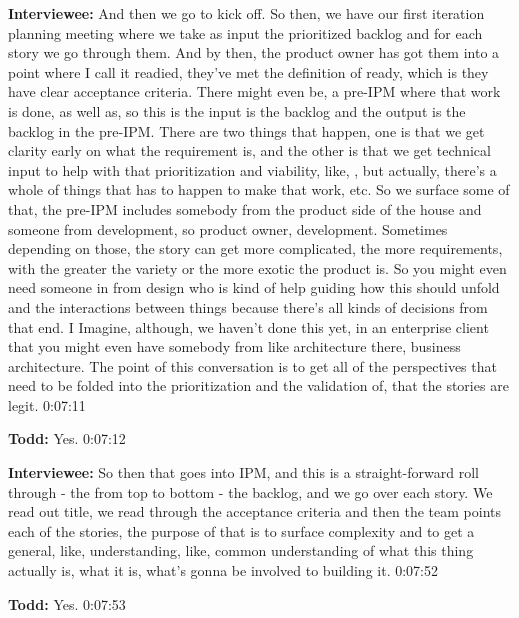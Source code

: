\textbf{Interviewee:}   And then we go to kick off.  So then, we have our first iteration planning meeting where we take as input the prioritized backlog and for each story we go through them.  And by then, the product owner has got them into a point where I call it readied, they've met the definition of ready, which is they have clear acceptance criteria.  There might even be, a pre-IPM where that work is done, as well as, so this is the input is the backlog and the output is the backlog in the pre-IPM.  There are two things that happen, one is that we get clarity early on what the requirement is, and the other is that we get technical input to help with that prioritization and viability, like, , but actually, there's a whole of things that has to happen to make that work, etc. So we surface some of that, the pre-IPM includes somebody from the product side of the house and someone from development, so product owner, development.  Sometimes depending on those, the story can get more complicated, the more requirements, with the greater the variety or the more exotic the product is.  So you might even need someone in from design who is kind of help guiding how this should unfold and the interactions between things because there's all kinds of decisions from that end.  I Imagine, although, we haven't done this yet, in an enterprise client that you might even have somebody from like architecture there, business architecture.  The point of this conversation is to get all of the perspectives that need to be folded into the prioritization and the validation of, that the stories are legit.  0:07:11

\textbf{Todd:}  	Yes.  0:07:12

\textbf{Interviewee:}  	So then that goes into IPM, and this is a straight-forward roll through - the from top to bottom - the backlog, and we go over each story.  We read out title, we read through the acceptance criteria and then the team points each of the stories, the purpose of that is to surface complexity and to get a general, like, understanding, like, common understanding of what this thing actually is, what it is, what's gonna be involved to building it.  0:07:52

\textbf{Todd:}  	Yes.  0:07:53

